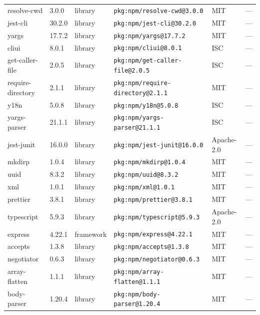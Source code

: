 \documentclass[11pt,a4paper]{article}
\begin{document}
\begin{longtable}{|p{4cm}|p{2cm}|p{1.6cm}|p{5cm}|p{1.5cm}|p{3.5cm}|}
\raggedright resolve-cwd & 3.0.0 & library & \small\texttt{pkg:npm/resolve-cwd@3.0.0} & MIT & \small — \\
\raggedright jest-cli & 30.2.0 & library & \small\texttt{pkg:npm/jest-cli@30.2.0} & MIT & \small — \\
\raggedright yargs & 17.7.2 & library & \small\texttt{pkg:npm/yargs@17.7.2} & MIT & \small — \\
\raggedright cliui & 8.0.1 & library & \small\texttt{pkg:npm/cliui@8.0.1} & ISC & \small — \\
\raggedright get-caller-file & 2.0.5 & library & \small\texttt{pkg:npm/get-caller-file@2.0.5} & ISC & \small — \\
\raggedright require-directory & 2.1.1 & library & \small\texttt{pkg:npm/require-directory@2.1.1} & MIT & \small — \\
\raggedright y18n & 5.0.8 & library & \small\texttt{pkg:npm/y18n@5.0.8} & ISC & \small — \\
\raggedright yargs-parser & 21.1.1 & library & \small\texttt{pkg:npm/yargs-parser@21.1.1} & ISC & \small — \\
\raggedright jest-junit & 16.0.0 & library & \small\texttt{pkg:npm/jest-junit@16.0.0} & Apache-2.0 & \small — \\
\raggedright mkdirp & 1.0.4 & library & \small\texttt{pkg:npm/mkdirp@1.0.4} & MIT & \small — \\
\raggedright uuid & 8.3.2 & library & \small\texttt{pkg:npm/uuid@8.3.2} & MIT & \small — \\
\raggedright xml & 1.0.1 & library & \small\texttt{pkg:npm/xml@1.0.1} & MIT & \small — \\
\raggedright prettier & 3.8.1 & library & \small\texttt{pkg:npm/prettier@3.8.1} & MIT & \small — \\
\raggedright typescript & 5.9.3 & library & \small\texttt{pkg:npm/typescript@5.9.3} & Apache-2.0 & \small — \\
\raggedright express & 4.22.1 & framework & \small\texttt{pkg:npm/express@4.22.1} & MIT & \small — \\
\raggedright accepts & 1.3.8 & library & \small\texttt{pkg:npm/accepts@1.3.8} & MIT & \small — \\
\raggedright negotiator & 0.6.3 & library & \small\texttt{pkg:npm/negotiator@0.6.3} & MIT & \small — \\
\raggedright array-flatten & 1.1.1 & library & \small\texttt{pkg:npm/array-flatten@1.1.1} & MIT & \small — \\
\raggedright body-parser & 1.20.4 & library & \small\texttt{pkg:npm/body-parser@1.20.4} & MIT & \small — \\

\end{longtable}
\end{document}
